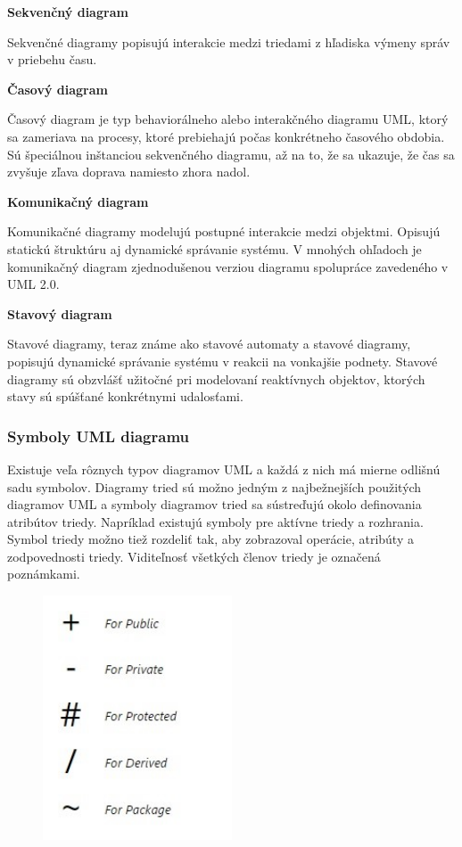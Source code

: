 \documentclass[a4paper]{feidippp}
\begin{document}
\textbf {Sekvenčný diagram}

Sekvenčné diagramy popisujú interakcie medzi triedami z hľadiska výmeny správ v priebehu času.

\textbf {Časový diagram}

Časový diagram je typ behaviorálneho alebo interakčného diagramu UML, ktorý sa zameriava na procesy, ktoré prebiehajú počas konkrétneho časového obdobia. Sú špeciálnou inštanciou sekvenčného diagramu, až na to, že sa ukazuje, že čas sa zvyšuje zľava doprava namiesto zhora nadol.

\textbf {Komunikačný diagram}

Komunikačné diagramy modelujú postupné interakcie medzi objektmi. Opisujú statickú štruktúru aj dynamické správanie systému. V mnohých ohľadoch je komunikačný diagram zjednodušenou verziou diagramu spolupráce zavedeného v UML 2.0.



\textbf {Stavový diagram }

Stavové diagramy, teraz známe ako stavové automaty a stavové diagramy, popisujú dynamické správanie systému v reakcii na vonkajšie podnety. Stavové diagramy sú obzvlášť užitočné pri modelovaní reaktívnych objektov, ktorých stavy sú spúšťané konkrétnymi udalosťami.


\subsubsection {Symboly UML diagramu }


Existuje veľa rôznych typov diagramov UML a každá z nich má mierne odlišnú sadu symbolov.
Diagramy tried sú možno jedným z najbežnejších použitých diagramov UML a symboly diagramov tried sa sústreďujú okolo definovania atribútov triedy. Napríklad existujú symboly pre aktívne triedy a rozhrania. Symbol triedy možno tiež rozdeliť tak, aby zobrazoval operácie, atribúty a zodpovednosti triedy.
Viditeľnosť všetkých členov triedy je označená poznámkami.


\begin{figure}[!ht]
\centering 
\includegraphics[width=0.5\textwidth]{dp.jpg}

\end{figure}
\end{document}

